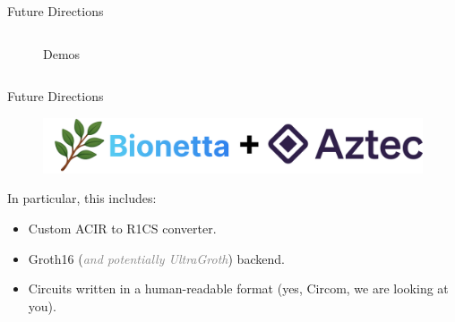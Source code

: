 \documentclass{zkdl-presentation-template}
\newcommand{\cmark}{\textcolor{green!65!black}{\ding{51}}}%
\begin{document}
\begin{frame}{Future Directions}
\begin{columns}
\begin{column}{0.5\textwidth}
\begin{figure}
                        \caption{Demos}
                    \end{figure}
                \end{column}
            \end{columns}
    \end{frame}

    \begin{frame}{Future Directions}
        \setlength{\fboxrule}{1.5pt}
            
            \begin{figure}
                \centering
                \includegraphics[width=\textwidth]{images/bionetta_aztec.png}
            \end{figure}

            In particular, this includes:
            \begin{itemize}[label=\cmark]
                \item Custom ACIR to R1CS converter.
                \item Groth16 (\textcolor{gray}{\textit{and potentially UltraGroth}}) backend.
                \item Circuits written in a human-readable format (yes, Circom,
                we are looking at you).
            \end{itemize}
    \end{frame}
\end{document}
